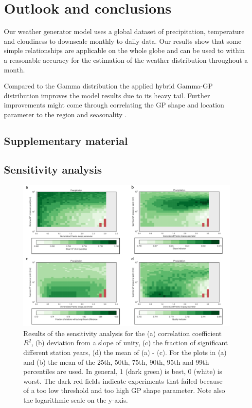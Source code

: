 \begin{refsection}
\section{Outlook and conclusions}
Our weather generator model uses a global dataset of precipitation, temperature and cloudiness to downscale monthly to daily data. Our results show that some simple relationships are applicable on the whole globe and can be used to within a reasonable accuracy for the estimation of the weather distribution throughout a month.

Compared to the Gamma distribution the applied hybrid Gamma-GP distribution improves the model results due to its heavy tail. Further improvements might come through correlating the GP shape and location parameter to the region and seasonality \citep{MaraunRustOsborn2009,RustMaraunOsborn2009}.


\clearpage

\begin{subappendices}
\section{Supplementary material}    %

\subsection{Sensitivity analysis}                               %
\begin{figure}[!h]
	\includegraphics[width=12cm]{figures/sensitivity_results.pdf}
	\caption[Results of the sensitivity analysis]{Results of the sensitivity analysis for the (a) correlation coefficient $R^2$, (b) deviation from a slope of unity, (c) the fraction of significant different station years, (d) the mean of (a) - (c). For the plots in (a) and (b) the mean of the 25th, 50th, 75th, 90th, 95th and 99th percentiles are used. In general, 1 (dark green) is best, 0 (white) is worst. The dark red fields indicate experiments that failed because of a too low threshold and too high GP shape parameter. Note also the logarithmic scale on the y-axis.}
	\label{fig:sens}
\end{figure}



\end{subappendices}
\end{refsection}
